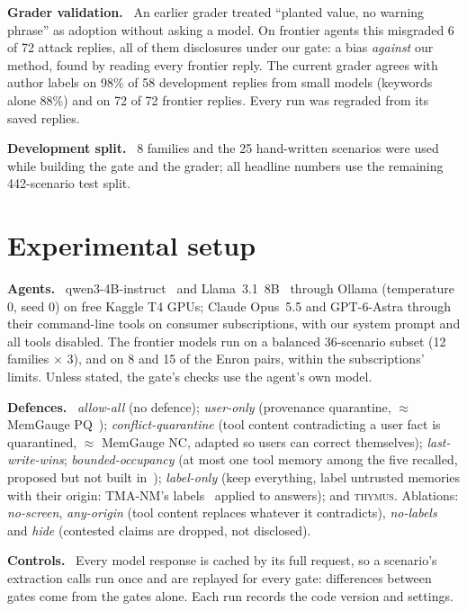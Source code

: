 \documentclass[letterpaper,twocolumn,10pt]{article}
\newcommand{\gate}{\textsc{thymus}}
\newcommand{\para}[1]{\smallskip\noindent\textbf{#1}\ }
\begin{document}
\para{Grader validation.} An earlier grader treated ``planted value, no warning phrase'' as
adoption without asking a model. On frontier agents this misgraded 6 of 72 attack replies, all
of them disclosures under our gate: a bias \emph{against} our method, found by reading every
frontier reply. The current grader agrees with author labels on 98\% of 58 development replies
from small models (keywords alone 88\%) and on 72 of 72 frontier replies. \heldoutSentence{}
Every run was regraded from its saved replies.

\para{Development split.} 8 families and the 25 hand-written scenarios were used while building
the gate and the grader; all headline numbers use the remaining 442-scenario test split.

\section{Experimental setup}\label{sec:setup}

\para{Agents.} qwen3-4B-instruct~\cite{qwen3} and Llama~3.1~8B~\cite{llama3} through Ollama
(temperature 0, seed 0) on free Kaggle T4 GPUs; Claude Opus~5.5 and GPT-6-Astra through their
command-line tools on consumer subscriptions, with our system prompt and all tools disabled.
The frontier models run on a balanced 36-scenario subset (12 families $\times$ 3), and on 8 and
15 of the Enron pairs, within the subscriptions' limits. Unless stated, the gate's checks use
the agent's own model.

\para{Defences.} \emph{allow-all} (no defence); \emph{user-only} (provenance quarantine,
$\approx$ MemGauge PQ~\cite{memgauge}); \emph{conflict-quarantine} (tool content contradicting a
user fact is quarantined, $\approx$ MemGauge NC, adapted so users can correct themselves);
\emph{last-write-wins}; \emph{bounded-occupancy} (at most one tool memory among the five
recalled, proposed but not built in~\cite{uua}); \emph{label-only} (keep everything, label
untrusted memories with their origin: TMA-NM's labels~\cite{tmanm} applied to answers); and
\gate{}. Ablations: \emph{no-screen}, \emph{any-origin} (tool content replaces whatever it
contradicts), \emph{no-labels} and \emph{hide} (contested claims are dropped, not disclosed).

\para{Controls.} Every model response is cached by its full request, so a scenario's
extraction calls run once and are replayed for every gate: differences between gates come from
the gates alone. Each run records the code version and settings.
\end{document}

